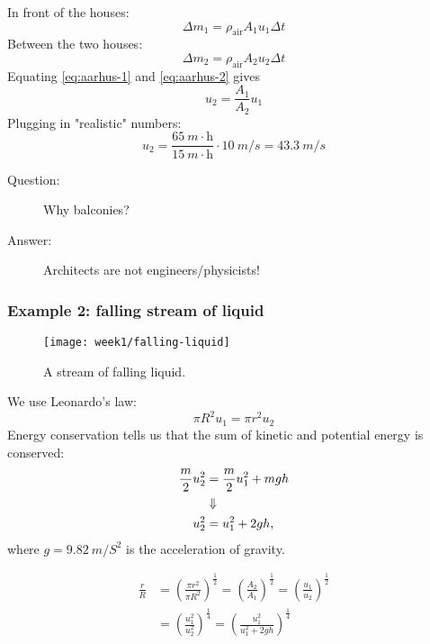 In front of the houses:
\begin{equation}
    \Delta m_1 = \rho_\mathrm{air} A_1 u_1 \Delta t
    \label{eq:aarhus-1}
\end{equation}
Between the two houses:
\begin{equation}
    \Delta m_2 = \rho_\mathrm{air} A_2 u_2 \Delta t
    \label{eq:aarhus-2}
\end{equation}
Equating \eqref{eq:aarhus-1} and \eqref{eq:aarhus-2} gives
\begin{equation}
    u_2 = \frac{A_1}{A_2} u_1
    \label{}
\end{equation}
Plugging in "realistic" numbers:
\begin{equation}
    u_2 = \frac{\SI{65}{m}\cdot\mathrm{h}}{\SI{15}{m}\cdot\mathrm{h}} \cdot \SI{10}{m/s} = \SI{43.3}{m/s}
    \label{}
\end{equation}

\begin{description}
    \item[Question:] Why balconies?
    \item[Answer:] Architects are not engineers/physicists!
\end{description}


\subsubsection{Example 2: falling stream of liquid}
\begin{figure}[h!]
    \centering
    \texttt{[image: week1/falling-liquid]}
    \caption{A stream of falling liquid.}
    \label{fig:falling-liquid}
\end{figure}

We use Leonardo's law:
\begin{equation}
    \pi R^2 u_1 = \pi r^2 u_2
    \label{}
\end{equation}
Energy conservation tells us that the sum of kinetic and potential energy is conserved:
\begin{align}
    \frac{m}{2}u_2^2 &= \frac{m}{2}u_1^2 + mgh\\
    &\Downarrow\notag\\
    u_2^2 &= u_1^2 + 2gh,
    \label{}
\end{align}
where $g=\SI{9.82}{m/S^2}$ is the acceleration of gravity.

\begin{align}
    \frac{r}{R} &= \left(\frac{\pi r^2}{\pi R^2}\right)^\frac{1}{2} = \left(\frac{A_2}{A_1}\right)^\frac{1}{2} = \left(\frac{u_1}{u_2}\right)^\frac{1}{2}\\
    &= \left(\frac{u_1^2}{u_2^2}\right)^\frac{1}{4} = \left(\frac{u_1^2}{u_1^2+2gh}\right)^\frac{1}{4}
    \label{}
\end{align}


